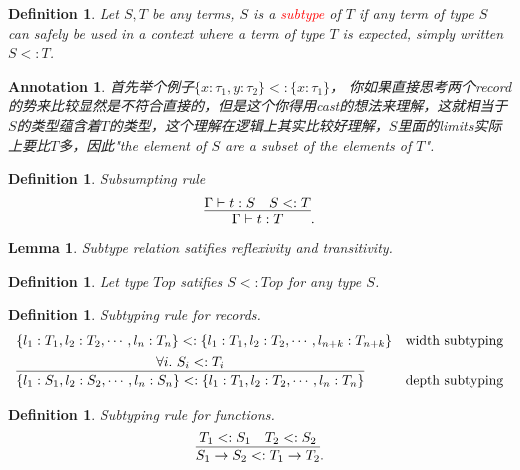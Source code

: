 \documentclass{article}
\theoremstyle{plain}
\newtheorem{lemma}[theorem]{Lemma}
\newtheorem{definition}[theorem]{Definition}
\newtheorem{annotation}[theorem]{Annotation}
\theoremstyle{nonumberplain}
\newcommand{\termtype}[2]{\ensuremath{#1:#2}}
\newcommand{\subtyp}[2]{#1<:#2}
\newcommand{\redt}[1]{\textcolor{red}{#1}}
\begin{document}
\begin{definition}
\rm Let $S,T$ be any terms, $S$ is a \redt{subtype} of $T$ if any term of type $S$ can safely be used in a context where a term of type $T$ is expected, simply written $\subtyp{S}{T}$. 
\end{definition}

\begin{annotation}
\rm 首先举个例子$\subtyp{\{x:\tau_1, y:\tau_2\} }{\{x:\tau_1\}}$，
你如果直接思考两个record的势来比较显然是不符合直接的，但是这个你得用cast的想法来理解，这就相当于$S$的类型蕴含着$T$的类型，这个理解在逻辑上其实比较好理解，$S$里面的limits实际上要比$T$多，因此"the element of $S$ are a subset of the elements of $T$". 
\end{annotation}

\begin{definition}
\rm Subsumpting rule
$$
\infer{\Gamma \vdash \termtype{t}{T}}{\Gamma \vdash \termtype{t}{S} & \subtyp{S}{T}}.
$$
\end{definition}

\begin{lemma}
\rm Subtype relation satifies reflexivity and transitivity. 
\end{lemma}

\begin{definition}
\rm Let type $Top$ satifies $\subtyp{S}{Top}$ for any type $S$. 
\end{definition}

\begin{definition}
\rm Subtyping rule for records.
$$
\begin{array}{ll}
\subtyp{\{l_1:T_1,l_2:T_2,\cdots,l_n:T_n\}}{\{l_1:T_1,l_2:T_2,\cdots,l_{n+k}:T_{n+k}\}} & \text{width subtyping} \\[0.5em]
\infer{\subtyp{\{l_1:S_1,l_2:S_2,\cdots,l_{n}:S_{n}\}}{\{l_1:T_1,l_2:T_2,\cdots,l_n:T_n\}}}{\forall i.~\subtyp{S_i}{T_i}} & \text{depth subtyping}
\end{array}
$$
\end{definition}

\begin{definition}
\rm Subtyping rule for functions.
$$
\infer{\subtyp{S_1 \to S_2}{T_1 \to T_2}}{\subtyp{T_1}{S_1} & \subtyp{T_2}{S_2}}.
$$
\end{definition}
\end{document}
